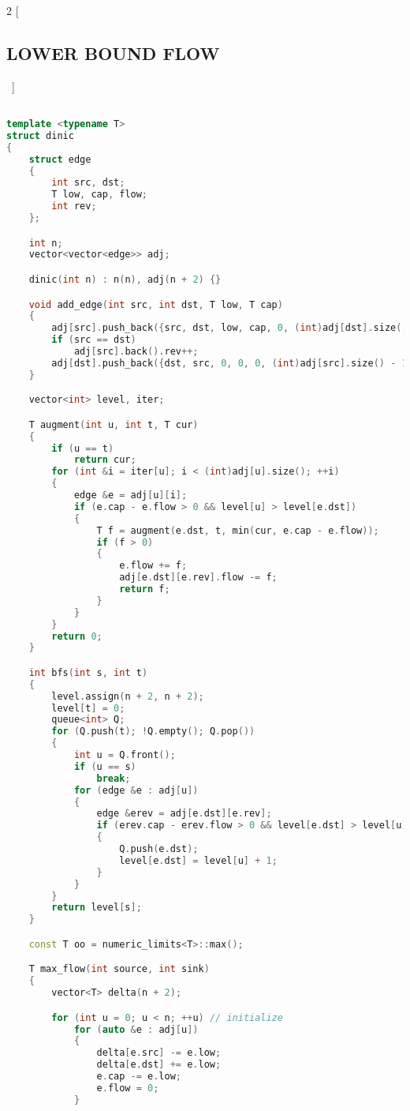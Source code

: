 \documentclass[leter]{amsart}
\begin{document}
\begin{multicols}{2}
[\subsection{LOWER BOUND FLOW}\ ]
\begin{lstlisting}[language=C++]

template <typename T>
struct dinic
{
    struct edge
    {
        int src, dst;
        T low, cap, flow;
        int rev;
    };

    int n;
    vector<vector<edge>> adj;

    dinic(int n) : n(n), adj(n + 2) {}

    void add_edge(int src, int dst, T low, T cap)
    {
        adj[src].push_back({src, dst, low, cap, 0, (int)adj[dst].size()});
        if (src == dst)
            adj[src].back().rev++;
        adj[dst].push_back({dst, src, 0, 0, 0, (int)adj[src].size() - 1});
    }

    vector<int> level, iter;

    T augment(int u, int t, T cur)
    {
        if (u == t)
            return cur;
        for (int &i = iter[u]; i < (int)adj[u].size(); ++i)
        {
            edge &e = adj[u][i];
            if (e.cap - e.flow > 0 && level[u] > level[e.dst])
            {
                T f = augment(e.dst, t, min(cur, e.cap - e.flow));
                if (f > 0)
                {
                    e.flow += f;
                    adj[e.dst][e.rev].flow -= f;
                    return f;
                }
            }
        }
        return 0;
    }

    int bfs(int s, int t)
    {
        level.assign(n + 2, n + 2);
        level[t] = 0;
        queue<int> Q;
        for (Q.push(t); !Q.empty(); Q.pop())
        {
            int u = Q.front();
            if (u == s)
                break;
            for (edge &e : adj[u])
            {
                edge &erev = adj[e.dst][e.rev];
                if (erev.cap - erev.flow > 0 && level[e.dst] > level[u] + 1)
                {
                    Q.push(e.dst);
                    level[e.dst] = level[u] + 1;
                }
            }
        }
        return level[s];
    }

    const T oo = numeric_limits<T>::max();

    T max_flow(int source, int sink)
    {
        vector<T> delta(n + 2);

        for (int u = 0; u < n; ++u) // initialize
            for (auto &e : adj[u])
            {
                delta[e.src] -= e.low;
                delta[e.dst] += e.low;
                e.cap -= e.low;
                e.flow = 0;
            }


\end{lstlisting}
\end{multicols}
\end{document}
